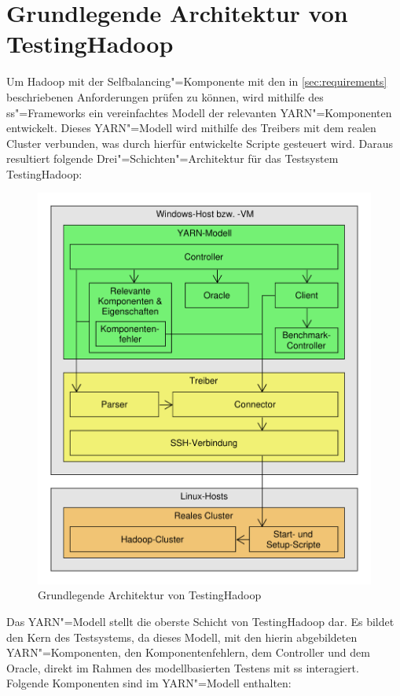 \section{Grundlegende Architektur von TestingHadoop}
\label{sec:modelArchitecture}

Um Hadoop mit der Selfbalancing"=Komponente mit den in \cref{sec:requirements} beschriebenen Anforderungen prüfen zu können, wird mithilfe des \gls{ss}"=Frameworks ein vereinfachtes Modell der relevanten YARN"=Komponenten entwickelt.
Dieses YARN"=Modell wird mithilfe des Treibers mit dem realen Cluster verbunden, was durch hierfür entwickelte Scripte gesteuert wird.
Daraus resultiert folgende Drei"=Schichten"=Architektur für das Testsystem TestingHadoop:

\begin{figure}[h]
    \includegraphics[width=0.6\columnwidth]{./resources/modelArchitecture.pdf}
    \caption{Grundlegende Architektur von TestingHadoop}
    \label{fig:modelArchitecture}
\end{figure}

Das YARN"=Modell stellt die oberste Schicht von TestingHadoop dar.
Es bildet den Kern des Testsystems, da dieses Modell, mit den hierin abgebildeten YARN"=Komponenten, den Komponentenfehlern, dem Controller und dem Oracle, direkt im Rahmen des modellbasierten Testens mit \gls{ss} interagiert.
Folgende Komponenten sind im YARN"=Modell enthalten:

